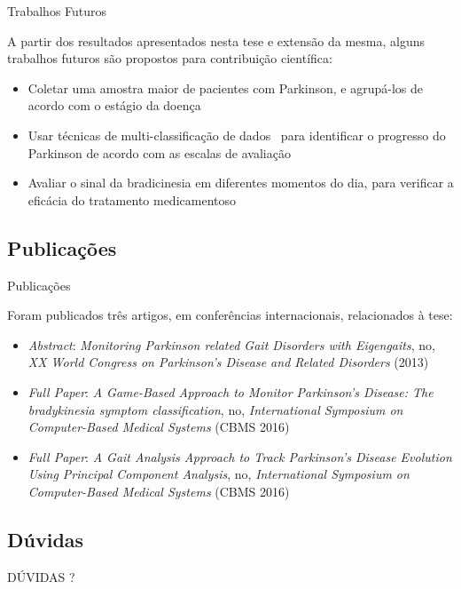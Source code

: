 \documentclass{beamer}
\begin{document}
\begin{frame}{Trabalhos Futuros}
\begin{block}{}
A partir dos resultados apresentados nesta tese e extensão da mesma, alguns trabalhos futuros são propostos para contribuição científica:
  \begin{itemize}
   \item Coletar uma amostra maior de pacientes com Parkinson, e agrupá-los de acordo com o estágio da doença~\cite{goul05}
   \item Usar técnicas de multi-classificação de dados~\cite{multisvm2011} para identificar o progresso do Parkinson de acordo com as escalas de avaliação
   \item Avaliar o sinal da bradicinesia em diferentes momentos do dia, para verificar a eficácia do tratamento medicamentoso~\cite{protpar010}
  \end{itemize}
\end{block}
\end{frame}


\subsection{Publicações}
\begin{frame}{Publicações}
\begin{block}{}
Foram publicados três artigos, em conferências internacionais, relacionados à tese: 
  \begin{itemize}
   \item \textit{Abstract}: \textit{Monitoring Parkinson related Gait Disorders with Eigengaits}, no, \textit{XX World Congress on Parkinson's Disease and Related Disorders} (2013)~\cite{lmmeigengaits2013}
   \item \textit{Full Paper}: \textit{A Game-Based Approach to Monitor Parkinson’s Disease: The bradykinesia symptom classification}, no, \textit{International Symposium on Computer-Based Medical Systems} (CBMS 2016)~\cite{lmmcbmsgame2016}
   \item \textit{Full Paper}: \textit{A Gait Analysis Approach to Track Parkinson’s Disease Evolution Using Principal Component Analysis}, no, \textit{International Symposium on Computer-Based Medical Systems} (CBMS 2016)~\cite{lmmcbmsgait2016}
  \end{itemize}
\end{block}
\end{frame}

\subsection{Dúvidas}
\begin{frame}
  \begin{center}
  DÚVIDAS ?
  \end{center}
\end{frame}


\end{document}
